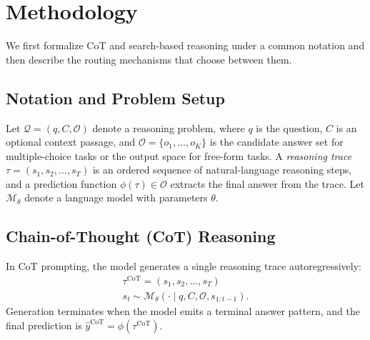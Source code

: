 \documentclass[11pt]{article}
\begin{document}

\section{Methodology}
\label{sec:method}

We first formalize CoT and search-based reasoning under a common notation and then describe the routing mechanisms that choose between them.

\subsection{Notation and Problem Setup}
\label{sec:notation}

Let $\mathcal{Q} = (q, C, \mathcal{O})$ denote a reasoning problem, where $q$ is the question, $C$ is an optional context passage, and $\mathcal{O} = \{o_1, \ldots, o_K\}$ is the candidate answer set for multiple-choice tasks or the output space for free-form tasks. A \emph{reasoning trace} $\tau = (s_1, s_2, \ldots, s_T)$ is an ordered sequence of natural-language reasoning steps, and a prediction function $\phi(\tau) \in \mathcal{O}$ extracts the final answer from the trace. Let $\mathcal{M}_\theta$ denote a language model with parameters $\theta$.

\subsection{Chain-of-Thought (CoT) Reasoning}
\label{sec:cot}

In CoT prompting, the model generates a single reasoning trace autoregressively:
\begin{equation}
\begin{aligned}
    \tau^{\text{CoT}} = (s_1, s_2, \ldots, s_T) \\
s_t \sim \mathcal{M}_\theta(\cdot \mid q, C, \mathcal{O}, s_{1:t-1}).
\end{aligned}
\label{eq:cot}
\end{equation}
Generation terminates when the model emits a terminal answer pattern, and the final prediction is $\hat{y}^{\text{CoT}} = \phi(\tau^{\text{CoT}})$.
\end{document}
